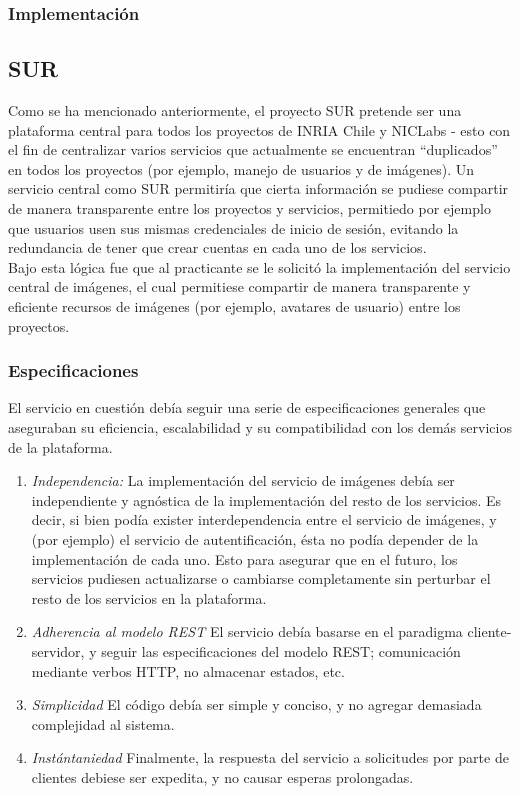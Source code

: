 \documentclass[11pt,letterpaper]{article}
\begin{document}
\subsubsection{Implementación}



\subsection{SUR}

Como se ha mencionado anteriormente, el proyecto SUR pretende ser una plataforma central para todos los proyectos de INRIA Chile y NICLabs - esto con el fin de centralizar varios servicios que actualmente se encuentran ``duplicados'' en todos los proyectos (por ejemplo, manejo de usuarios y de imágenes). Un servicio central como SUR permitiría que cierta información se pudiese compartir de manera transparente entre los proyectos y servicios, permitiedo por ejemplo que usuarios usen sus mismas credenciales de inicio de sesión, evitando la redundancia de tener que crear cuentas en cada uno de los servicios.
\\
Bajo esta lógica fue que al practicante se le solicitó la implementación del servicio central de imágenes, el cual permitiese compartir de manera transparente y eficiente recursos de imágenes (por ejemplo, avatares de usuario) entre los proyectos.

\subsubsection{Especificaciones}

El servicio en cuestión debía seguir una serie de especificaciones generales que aseguraban su eficiencia, escalabilidad y su compatibilidad con los demás servicios de la plataforma.

\begin{enumerate}
    \item \emph{Independencia:} \@ La implementación del servicio de imágenes debía ser independiente y agnóstica de la implementación del resto de los servicios. Es decir, si bien podía exister interdependencia entre el servicio de imágenes, y (por ejemplo) el servicio de autentificación, ésta no podía depender de la implementación de cada uno. Esto para asegurar que en el futuro, los servicios pudiesen actualizarse o cambiarse completamente sin perturbar el resto de los servicios en la plataforma.
    \item \emph{Adherencia al modelo REST} \@ El servicio debía basarse en el paradigma cliente-servidor, y seguir las especificaciones del modelo REST; comunicación mediante verbos HTTP, no almacenar estados, etc.
    \item \emph{Simplicidad} \@ El código debía ser simple y conciso, y no agregar demasiada complejidad al sistema.
    \item \emph{Instántaniedad} \@ Finalmente, la respuesta del servicio a solicitudes por parte de clientes debiese ser expedita, y no causar esperas prolongadas.
\end{enumerate}
\end{document}
